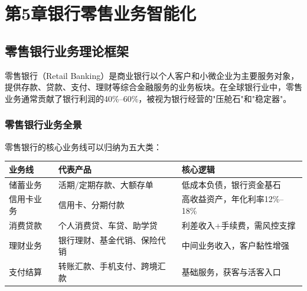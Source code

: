 
\chapter{第5章\quad 银行零售业务智能化}

\section{零售银行业务理论框架}

零售银行（Retail Banking）是商业银行以个人客户和小微企业为主要服务对象，提供存款、贷款、支付、理财等综合金融服务的业务板块。在全球银行业中，零售业务通常贡献了银行利润的40\%--60\%，被视为银行经营的"压舱石"和"稳定器"。

\subsection{零售银行业务全景}

零售银行的核心业务线可以归纳为五大类：

\begin{table}[H]
\centering
\begin{tabular}{lp{3.5cm}p{6cm}}
\toprule
\textbf{业务线} & \textbf{代表产品} & \textbf{核心逻辑} \\
\midrule
储蓄业务 & 活期/定期存款、大额存单 & 低成本负债，银行资金基石 \\
信用卡业务 & 信用卡、分期付款 & 高收益资产，年化利率12\%--18\% \\
消费贷款 & 个人消费贷、车贷、助学贷 & 利差收入+手续费，需风控支撑 \\
理财业务 & 银行理财、基金代销、保险代销 & 中间业务收入，客户黏性增强 \\
支付结算 & 转账汇款、手机支付、跨境汇款 & 基础服务，获客与活客入口 \\
\bottomrule
\end{tabular}
\end{table}

